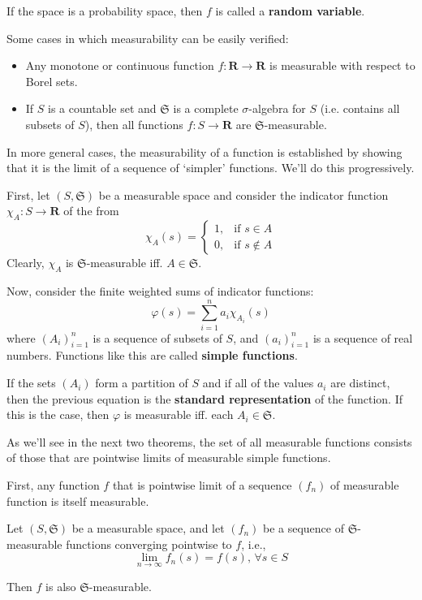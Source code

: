 If the space is a probability space, then $f$ is called a \textbf{random variable}.

Some cases in which measurability can be easily verified:
\begin{itemize}
	\item Any monotone or continuous function $f : \textbf{R} \longrightarrow \textbf{R}$ is measurable with respect to Borel sets.
	\item If $S$ is a countable set and $\mathfrak{S}$ is a complete $\sigma$-algebra for $S$ (i.e. contains all subsets of $S$), then all functions $f : S \longrightarrow \textbf{R}$ are $\mathfrak{S}$-measurable.
\end{itemize}

In more general cases, the measurability of a function is established by showing that it is the limit of a sequence of `simpler' functions. We'll do this progressively.

First, let $(S, \mathfrak{S})$ be a measurable space and consider the indicator function $\chi_A : S \longrightarrow \textbf{R}$ of the from
\[
\chi_A (s) = \begin{cases}
	1, & \text{if } s \in A\\
	0, & \text{if } s \notin A
	\end{cases}
\]
Clearly, $\chi_A$ is $\mathfrak{S}$-measurable iff. $A \in \mathfrak{S}$.

Now, consider the finite weighted sums of indicator functions:
\[
	\varphi(s) = \sum_{i=1}^n a_i \chi_{A_i}(s)
\]
where $(A_i)_{i=1}^n$ is a sequence of subsets of $S$, and $(a_i)_{i=1}^n$ is a sequence of real numbers. Functions like this are called \textbf{simple functions}.

If the sets $(A_i)$ form a partition of $S$ and if all of the values $a_i$ are distinct, then the previous equation is the \textbf{standard representation} of the function. If this is the case, then $\varphi$ is measurable iff. each $A_i \in \mathfrak{S}$.

As we'll see in the next two theorems, the set of all measurable functions consists of those that are pointwise limits of measurable simple functions.

First, any function $f$ that is pointwise limit of a sequence $(f_n)$ of measurable function is itself measurable.

\begin{theorem}
	Let $(S, \mathfrak{S})$ be a measurable space, and let $(f_n)$ be a sequence of $\mathfrak{S}$-measurable functions converging pointwise to $f$, i.e.,
	\[
		\lim_{n \to \infty} f_n(s) = f(s), \, \forall s \in S
	\]

	Then $f$ is also $\mathfrak{S}$-measurable.
\end{theorem}

